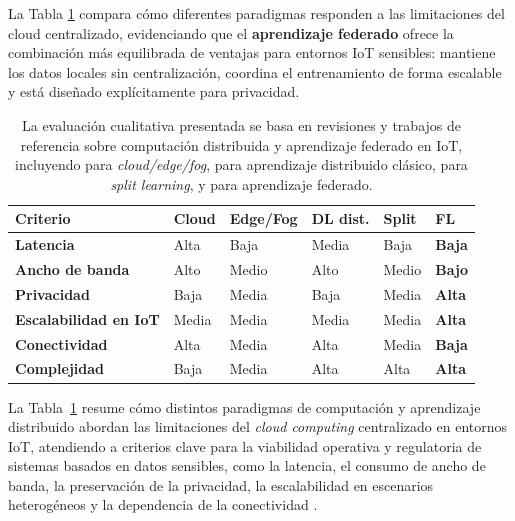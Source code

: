 \documentclass{report}
\begin{document}
La Tabla \ref{tab:comparativa_paradigmas_fl} compara cómo diferentes paradigmas responden a las limitaciones del cloud centralizado, evidenciando que el \textbf{aprendizaje federado} ofrece la combinación más equilibrada de ventajas para entornos IoT sensibles: mantiene los datos locales sin centralización, coordina el entrenamiento de forma escalable y está diseñado explícitamente para privacidad.

\begin{table}[H]
\centering
\small
\caption{Comparativa de paradigmas distribuidos para ML en IoT frente a limitaciones del cloud centralizado.}
\label{tab:comparativa_paradigmas_fl}
\renewcommand{\arraystretch}{1.25}
\setlength{\tabcolsep}{4pt}

\begin{tabular}{p{3.3cm} p{2.1cm} p{2.1cm} p{2.1cm} p{2.1cm} p{2.1cm}}
\toprule
\textbf{Criterio} & \textbf{Cloud} & \textbf{Edge/Fog} & \textbf{DL dist.} & \textbf{Split} & \textbf{FL} \\
\midrule
\textbf{Latencia} & Alta & Baja & Media & Baja & \textbf{Baja} \\
\midrule
\textbf{Ancho de banda} & Alto & Medio & Alto & Medio & \textbf{Bajo} \\
\midrule
\textbf{Privacidad} & Baja & Media & Baja & Media & \textbf{Alta} \\
\midrule
\textbf{Escalabilidad en IoT} & Media & Media & Media & Media & \textbf{Alta} \\
\midrule
\textbf{Conectividad} & Alta & Media & Alta & Media & \textbf{Baja} \\
\midrule
\textbf{Complejidad} & Baja & Media & Alta & Alta & \textbf{Alta} \\
\bottomrule
\end{tabular}
\caption*{\footnotesize
La evaluación cualitativa presentada se basa en revisiones y trabajos de referencia sobre computación distribuida y aprendizaje federado en IoT, incluyendo \cite{shi2016edge,satyanarayanan2017emergence,naha2018fog} para \textit{cloud/edge/fog}, \cite{dean2012distbelief,li2014parameterserver} para aprendizaje distribuido clásico, \cite{vepakomma2018splitnn,gupta2018split} para \textit{split learning}, y \cite{mcmahan2017communication,kairouz2021advances} para aprendizaje federado.
}
\end{table}

La Tabla~\ref{tab:comparativa_paradigmas_fl} resume cómo distintos paradigmas de computación y aprendizaje distribuido abordan las limitaciones del \textit{cloud computing} centralizado en entornos IoT, atendiendo a criterios clave para la viabilidad operativa y regulatoria de sistemas basados en datos sensibles, como la latencia, el consumo de ancho de banda, la preservación de la privacidad, la escalabilidad en escenarios heterogéneos y la dependencia de la conectividad \cite{shi2016edge,satyanarayanan2017emergence,naha2018fog}.
\end{document}
